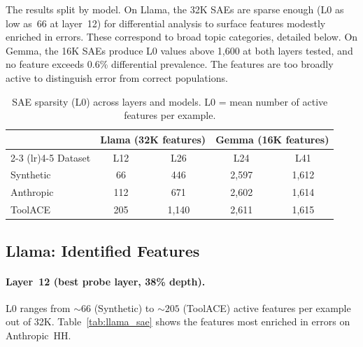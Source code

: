 \documentclass{article}
\begin{document}
The results split by model.
On Llama, the 32K SAEs are sparse enough (L0 as low as~66 at layer~12) for
differential analysis to surface features modestly enriched in errors.
These correspond to broad topic categories, detailed below.
On Gemma, the 16K SAEs produce L0 values above 1,600 at both layers tested,
and no feature exceeds 0.6\% differential prevalence. The features are too
broadly active to distinguish error from correct populations.

\begin{table}[t]
\centering
\caption{SAE sparsity (L0) across layers and models.
  L0 = mean number of active features per example.}
\label{tab:sae_sparsity}
\begin{tabular}{lcccc}
\toprule
          & \multicolumn{2}{c}{Llama (32K features)} & \multicolumn{2}{c}{Gemma (16K features)} \\
\cmidrule(lr){2-3} \cmidrule(lr){4-5}
Dataset   & L12   & L26   & L24    & L41    \\
\midrule
Synthetic & 66    & 446   & 2,597  & 1,612  \\
Anthropic & 112   & 671   & 2,602  & 1,614  \\
ToolACE   & 205   & 1,140 & 2,611  & 1,615  \\
\bottomrule
\end{tabular}
\end{table}

\subsection{Llama: Identified Features}

\paragraph{Layer~12 (best probe layer, 38\% depth).}
L0 ranges from ${\sim}66$ (Synthetic) to ${\sim}205$ (ToolACE) active features
per example out of 32K.
Table~\ref{tab:llama_sae} shows the features most enriched in errors on
Anthropic~HH.
\end{document}
